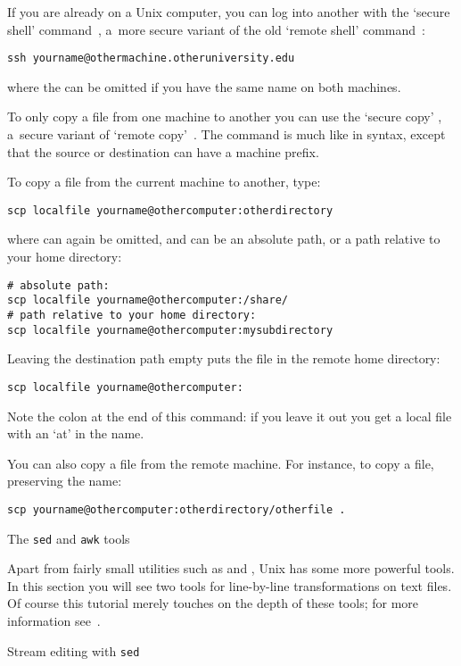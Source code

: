 If you are already on a Unix computer, you can log into another with
the `secure shell' command~, a~more secure variant
of the old `remote shell' command~:
\begin{verbatim}
ssh yourname@othermachine.otheruniversity.edu
\end{verbatim}
where the  can be omitted if you have the same name on
both machines.

To only copy a file from one machine to another you can use the
`secure copy' , a~secure variant of `remote
copy'~. The  command is much like  in syntax,
except that the source or destination can have a machine prefix.

To copy a file from the current machine to
another, type:
\begin{verbatim}
scp localfile yourname@othercomputer:otherdirectory
\end{verbatim}
where  can again be omitted, and  can be
an absolute path, or a path relative to your home directory:
\begin{verbatim}
# absolute path:
scp localfile yourname@othercomputer:/share/
# path relative to your home directory:
scp localfile yourname@othercomputer:mysubdirectory
\end{verbatim}
Leaving the destination path empty puts the file in the remote home directory:
\begin{verbatim}
scp localfile yourname@othercomputer:
\end{verbatim}
Note the colon at the end of this command: if you leave it out you get
a local file with an `at' in the name.

You can also copy a file from the remote machine. For instance, to
copy a file, preserving the name:
\begin{verbatim}
scp yourname@othercomputer:otherdirectory/otherfile .
\end{verbatim}

 {The {\tt sed} and {\tt awk} tools}

Apart from fairly small utilities such as  and , Unix
has some more powerful tools. In this section you will see two tools for
line-by-line transformations on text files. Of course this tutorial
merely touches on the depth of these tools; for more information
see~\cite{AWK:awk,OReilly:sedawk}.

 {Stream editing with \protect\texttt{sed}}

